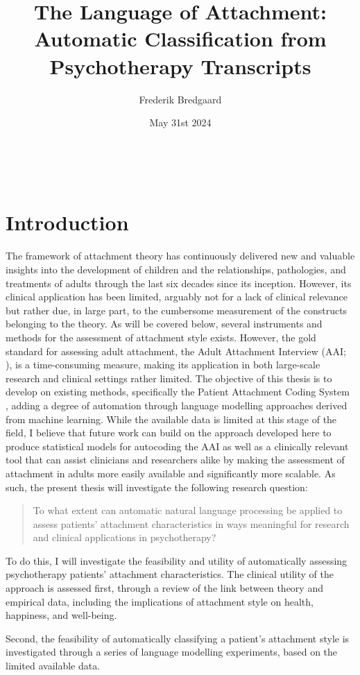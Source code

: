 \documentclass[12pt]{report}
\title{The Language of Attachment: Automatic Classification from Psychotherapy Transcripts}
\author{Frederik Bredgaard}
\date{May 31st 2024}
\begin{document}
\maketitle
\
\tableofcontents

\chapter*{Introduction}
The framework of attachment theory has continuously delivered new and valuable insights into the development of children and the relationships, pathologies, and treatments of adults through the last six decades since its inception.
However, its clinical application has been limited, arguably not for a lack of clinical relevance but rather due, in large part, to the cumbersome measurement of the constructs belonging to the theory.
As will be covered below, several instruments and methods for the assessment of attachment style exists. However, the gold standard for assessing adult attachment, the Adult Attachment Interview (AAI; ), is a time-consuming measure, making its application in both large-scale research and clinical settings rather limited.
The objective of this thesis is to develop on existing methods, specifically the Patient Attachment Coding System \cite{Talia2017}, adding a degree of automation through language modelling approaches derived from machine learning.
While the available data is limited at this stage of the field, I believe that future work can build on the approach developed here to produce statistical models for autocoding the AAI as well as a clinically relevant tool that can assist clinicians and researchers alike by making the assessment of attachment in adults more easily available and significantly more scalable.
As such, the present thesis will investigate the following research question:
\begin{quote}
    To what extent can automatic natural language processing be applied to assess patients' attachment characteristics in ways meaningful for research and clinical applications in psychotherapy?
\end{quote}
To do this, I will investigate the feasibility and utility of automatically assessing psychotherapy patients' attachment characteristics.
The clinical utility of the approach is assessed first, through a review of the link between theory and empirical data, including the implications of attachment style on health, happiness, and well-being.

Second, the feasibility of automatically classifying a patient's attachment style is investigated through a series of language modelling experiments, based on the limited available data.
\end{document}
